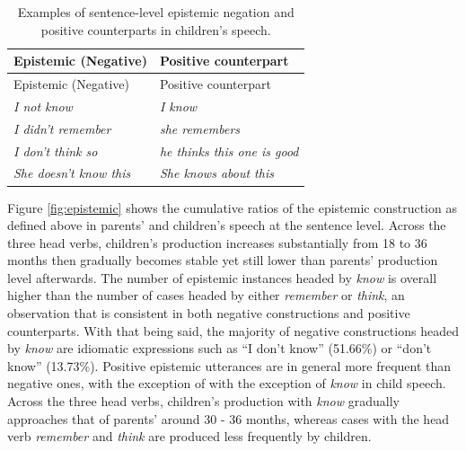 \documentclass[
  english,
  man,floatsintext]{apa6}
\begin{document}
\begin{longtable}[]{@{}ll@{}}
\caption{\label{tab:epistem} Examples of sentence-level epistemic negation and positive counterparts in children's speech.}\tabularnewline
\toprule
Epistemic (Negative) & Positive counterpart \\
\midrule
\endfirsthead
\toprule
Epistemic (Negative) & Positive counterpart \\
\midrule
\endhead
\emph{I not know} & \emph{I know} \\
\emph{I didn't remember} & \emph{she remembers} \\
\emph{I don't think so} & \emph{he thinks this one is good} \\
\emph{She doesn't know this} & \emph{She knows about this} \\
\bottomrule
\end{longtable}

Figure \ref{fig:epistemic} shows the cumulative ratios of the epistemic construction as defined above in parents' and children's speech at the sentence level. Across the three head verbs, children's production increases substantially from 18 to 36 months then gradually becomes stable yet still lower than parents' production level afterwards. The number of epistemic instances headed by \emph{know} is overall higher than the number of cases headed by either \emph{remember} or \emph{think}, an observation that is consistent in both negative constructions and positive counterparts. With that being said, the majority of negative constructions headed by \emph{know} are idiomatic expressions such as ``I don't know'' (51.66\%) or ``don't know'' (13.73\%). Positive epistemic utterances are in general more frequent than negative ones, with the exception of with the exception of \emph{know} in child speech. Across the three head verbs, children's production with \emph{know} gradually approaches that of parents' around 30 - 36 months, whereas cases with the head verb \emph{remember} and \emph{think} are produced less frequently by children.
\end{document}
